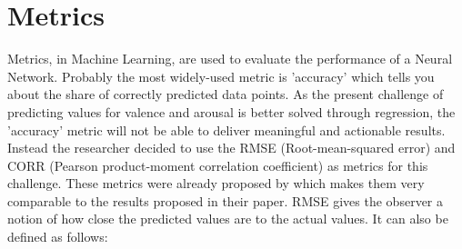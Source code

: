 

\section{Metrics}
Metrics, in Machine Learning, are used to evaluate the performance of a Neural Network. Probably the most widely-used metric is 'accuracy' which tells you about the share of correctly predicted data points. 
\newline\newline
As the present challenge of predicting values for valence and arousal is better solved through regression, the 'accuracy' metric will not be able to deliver meaningful and actionable results. Instead the researcher decided to use the RMSE (Root-mean-squared error) and CORR (Pearson product-moment correlation coefficient) as metrics for this challenge. These metrics were already proposed by \citet{Kossaifi:2017:AFEW-VADatabase} which makes them very comparable to the results proposed in their paper.
\newline\newline
RMSE gives the observer a notion of how close the predicted values are to the actual values. It can also be defined as follows:

